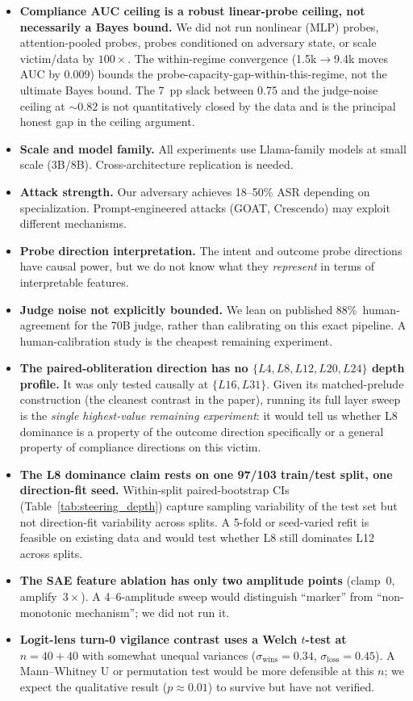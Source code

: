 \documentclass[11pt]{article}
\begin{document}
\begin{itemize}[leftmargin=*]
  \item \textbf{Compliance AUC ceiling is a robust linear-probe ceiling, not necessarily a Bayes bound.} We did not run nonlinear (MLP) probes, attention-pooled probes, probes conditioned on adversary state, or scale victim/data by $100\times$. The within-regime convergence (1.5k$\to$9.4k moves AUC by 0.009) bounds the probe-capacity-gap-within-this-regime, not the ultimate Bayes bound. The 7~pp slack between 0.75 and the judge-noise ceiling at $\sim 0.82$ is not quantitatively closed by the data and is the principal honest gap in the ceiling argument.
  \item \textbf{Scale and model family.} All experiments use Llama-family models at small scale (3B/8B). Cross-architecture replication is needed.
  \item \textbf{Attack strength.} Our adversary achieves 18--50\% ASR depending on specialization. Prompt-engineered attacks (GOAT, Crescendo) may exploit different mechanisms.
  \item \textbf{Probe direction interpretation.} The intent and outcome probe directions have causal power, but we do not know what they \emph{represent} in terms of interpretable features.
  \item \textbf{Judge noise not explicitly bounded.} We lean on published 88\%~human-agreement for the 70B judge, rather than calibrating on this exact pipeline. A human-calibration study is the cheapest remaining experiment.
  \item \textbf{The paired-obliteration direction has no $\{L4, L8, L12, L20, L24\}$ depth profile.} It was only tested causally at $\{L16, L31\}$. Given its matched-prelude construction (the cleanest contrast in the paper), running its full layer sweep is the \emph{single highest-value remaining experiment}: it would tell us whether L8 dominance is a property of the outcome direction specifically or a general property of compliance directions on this victim.
  \item \textbf{The L8 dominance claim rests on one 97/103 train/test split, one direction-fit seed.} Within-split paired-bootstrap CIs (Table~\ref{tab:steering_depth}) capture sampling variability of the test set but not direction-fit variability across splits. A 5-fold or seed-varied refit is feasible on existing data and would test whether L8 still dominates L12 across splits.
  \item \textbf{The SAE feature ablation has only two amplitude points} (clamp~0, amplify~$3\times$). A 4--6-amplitude sweep would distinguish ``marker'' from ``non-monotonic mechanism''; we did not run it.
  \item \textbf{Logit-lens turn-0 vigilance contrast uses a Welch $t$-test at $n{=}40{+}40$} with somewhat unequal variances ($\sigma_{\text{wins}}{=}0.34$, $\sigma_{\text{loss}}{=}0.45$). A Mann--Whitney U or permutation test would be more defensible at this $n$; we expect the qualitative result ($p \approx 0.01$) to survive but have not verified.
\end{itemize}
\end{document}
